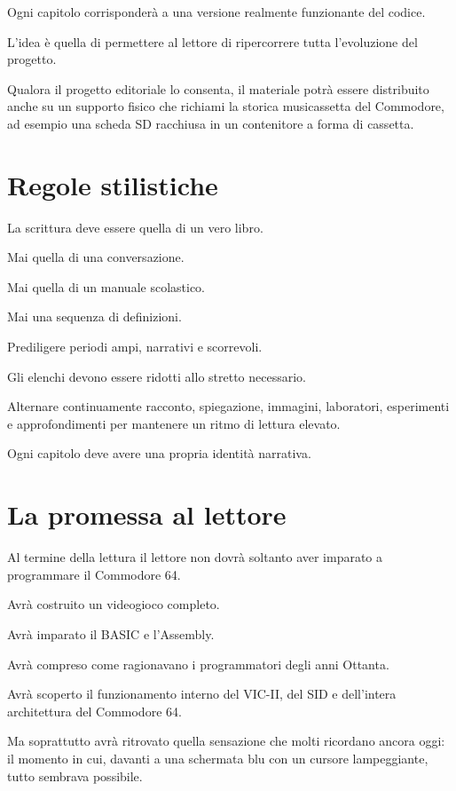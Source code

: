 \documentclass{article}
\begin{document}
Ogni capitolo corrisponderà a una versione realmente funzionante del codice.

L'idea è quella di permettere al lettore di ripercorrere tutta l'evoluzione del progetto.

Qualora il progetto editoriale lo consenta, il materiale potrà essere distribuito anche su un supporto fisico che
richiami la storica musicassetta del Commodore, ad esempio una scheda SD racchiusa in un contenitore a forma di
cassetta.



\section{Regole stilistiche}
La scrittura deve essere quella di un vero libro.

Mai quella di una conversazione.

Mai quella di un manuale scolastico.

Mai una sequenza di definizioni.

Prediligere periodi ampi, narrativi e scorrevoli.

Gli elenchi devono essere ridotti allo stretto necessario.

Alternare continuamente racconto, spiegazione, immagini, laboratori, esperimenti e approfondimenti per mantenere un
ritmo di lettura elevato.

Ogni capitolo deve avere una propria identità narrativa.



\section{La promessa al lettore}
Al termine della lettura il lettore non dovrà soltanto aver imparato a programmare il Commodore 64.

Avrà costruito un videogioco completo.

Avrà imparato il BASIC e l'Assembly.

Avrà compreso come ragionavano i programmatori degli anni Ottanta.

Avrà scoperto il funzionamento interno del VIC-II, del SID e dell'intera architettura del Commodore 64.

Ma soprattutto avrà ritrovato quella sensazione che molti ricordano ancora oggi: il momento in cui, davanti a una
schermata blu con un cursore lampeggiante, tutto sembrava possibile.


\bigskip
\end{document}
